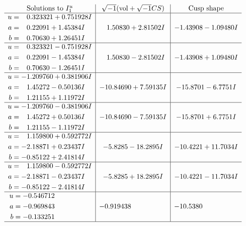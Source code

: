 \documentclass[1p]{elsarticle_modified}
\theoremstyle{definition}
\newcommand{\I}{\sqrt{-1}}
\begin{document}
$$\begin{array}{c|c|c}  
\text{Solutions to }I^u_{1}& \I (\text{vol} + \sqrt{-1}CS) & \text{Cusp shape}\\
 \hline 
\begin{aligned}
u &= \phantom{-}0.323321 + 0.751928 I \\
a &= \phantom{-}0.22091 + 1.45384 I \\
b &= \phantom{-}0.70630 + 1.26451 I\end{aligned}
 & \phantom{-}1.50830 + 2.81502 I & -1.43908 - 1.09480 I \\ \hline\begin{aligned}
u &= \phantom{-}0.323321 - 0.751928 I \\
a &= \phantom{-}0.22091 - 1.45384 I \\
b &= \phantom{-}0.70630 - 1.26451 I\end{aligned}
 & \phantom{-}1.50830 - 2.81502 I & -1.43908 + 1.09480 I \\ \hline\begin{aligned}
u &= -1.209760 + 0.381906 I \\
a &= \phantom{-}1.45272 - 0.50136 I \\
b &= \phantom{-}1.21155 + 1.11972 I\end{aligned}
 & -10.84690 + 7.59135 I & -15.8701 - 6.7751 I \\ \hline\begin{aligned}
u &= -1.209760 - 0.381906 I \\
a &= \phantom{-}1.45272 + 0.50136 I \\
b &= \phantom{-}1.21155 - 1.11972 I\end{aligned}
 & -10.84690 - 7.59135 I & -15.8701 + 6.7751 I \\ \hline\begin{aligned}
u &= \phantom{-}1.159800 + 0.592772 I \\
a &= -2.18871 + 0.23437 I \\
b &= -0.85122 + 2.41814 I\end{aligned}
 & -5.8285 - 18.2895 I & -10.4221 + 11.7034 I \\ \hline\begin{aligned}
u &= \phantom{-}1.159800 - 0.592772 I \\
a &= -2.18871 - 0.23437 I \\
b &= -0.85122 - 2.41814 I\end{aligned}
 & -5.8285 + 18.2895 I & -10.4221 - 11.7034 I \\ \hline\begin{aligned}
u &= -0.546712\phantom{ +0.000000I} \\
a &= -0.969843\phantom{ +0.000000I} \\
b &= -0.133251\phantom{ +0.000000I}\end{aligned}
 & -0.919438\phantom{ +0.000000I} & -10.5380\phantom{ +0.000000I}\\
 \hline 
 \end{array}$$\newpage\newpage\renewcommand{\arraystretch}{1}
\end{document}
